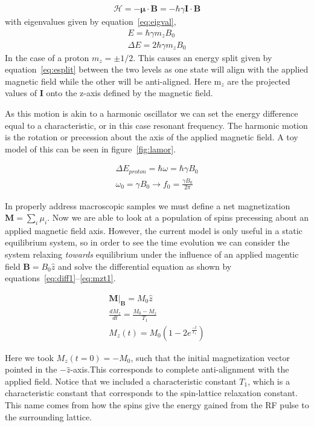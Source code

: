 \documentclass[
reprint,
amsmath,amssymb,
aps,
tikz,
border=5pt
]{revtex4-1}
\begin{document}
  \begin{gather}
    \mathscr{H} = -\mathbf{\mu}\cdot \mathbf{B} = -\hbar \gamma\mathbf{I}\cdot \mathbf{B} 
  \end{gather}
  with eigenvalues given by equation~\ref{eq:eigval}, ~\cite{nmr65}
  \begin{gather}
    E = \hbar \gamma m_z B_0 \label{eq:eigval}\\
    \Delta E = 2 \hbar \gamma m_z B_0 \label{eq:esplit}
  \end{gather}
  In the case of a proton $m_z = \pm 1/2$. This causes an energy split given by equation~\ref{eq:esplit} between the two levels as one state will align with the applied magnetic field while the other will be anti-aligned. Here m$_z$ are the projected values of \textbf{I} onto the z-axis defined by the magnetic field. 


  As this motion is akin to a harmonic oscillator we can set the energy difference equal to a characteristic, or in this case resonant frequency. The harmonic motion is the rotation or precession about the axis of the applied magnetic field. A toy model of this can be seen in figure~\ref{fig:lamor}. 

  \begin{gather}
    \Delta E_{proton} = \hbar \omega =  \hbar \gamma B_0 \nonumber \\
    \omega_0 = \gamma B_0 \rightarrow f_0 = \frac{\gamma B_0}{2 \pi}
  \end{gather}

  In properly address macroscopic samples we must define a net magnetization $\mathbf{M} = \sum_{i} \mu_i$. Now  we are able to look at a population of spins precessing about an applied magnetic field axis. However, the current model is only useful in a static equilibrium system, so in order to see the time evolution we can consider the system relaxing \textit{towards} equilibrium under the influence of an applied magentic field $\mathbf{B} = B_0 \hat{z}$ and solve the differential equation as shown by equations~\ref{eq:diff1}--\ref{eq:mzt1}.

\begin{gather}
    \mathbf{M}|_{\mathbf{B}} = M_0 \hat{z} \label{eq:diff1} \\
    \frac{dM_z}{dt} = \frac{M_0 - M_{z}}{T_1} \\
    M_z(t) = M_0 \left(1-2 e^\frac{-t}{T_1}\right) \label{eq:mzt1}
\end{gather}

  Here we took $M_z(t=0) = -M_0$, such that the initial magnetization vector pointed in the $-\hat{z}$-axis.This corresponds to complete anti-alignment with the applied field. Notice that we included a characteristic constant $T_1$, which is a characteristic constant that corresponds to the spin-lattice relaxation constant. This name comes from how the spins give the energy gained from the RF pulse to the surrounding lattice.~\cite{nmr65}
\end{document}
